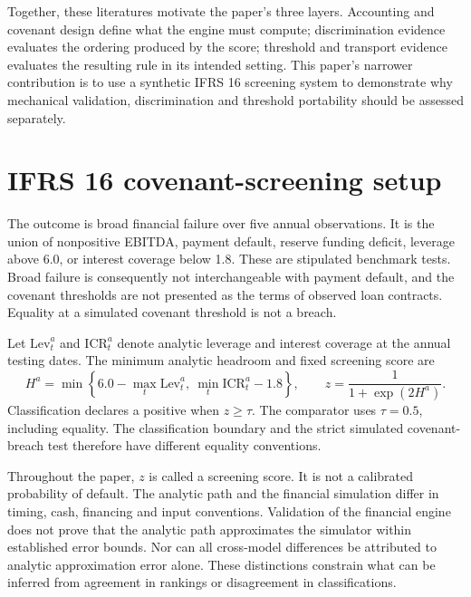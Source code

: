 \documentclass[11pt,a4paper]{article}
\begin{document}
Together, these literatures motivate the paper's three layers. Accounting and covenant design define what the engine must compute; discrimination evidence evaluates the ordering produced by the score; threshold and transport evidence evaluates the resulting rule in its intended setting. This paper's narrower contribution is to use a synthetic IFRS 16 screening system to demonstrate why mechanical validation, discrimination and threshold portability should be assessed separately.

\section{IFRS 16 covenant-screening setup}
The outcome is broad financial failure over five annual observations. It is the union of nonpositive EBITDA, payment default, reserve funding deficit, leverage above 6.0, or interest coverage below 1.8. These are stipulated benchmark tests. Broad failure is consequently not interchangeable with payment default, and the covenant thresholds are not presented as the terms of observed loan contracts. Equality at a simulated covenant threshold is not a breach.

Let $\mathrm{Lev}^{a}_{t}$ and $\mathrm{ICR}^{a}_{t}$ denote analytic leverage and interest coverage at the annual testing dates. The minimum analytic headroom and fixed screening score are
\begin{equation}
H^a=\min\left\{6.0-\max_t\mathrm{Lev}^{a}_{t},\ \min_t\mathrm{ICR}^{a}_{t}-1.8\right\},
\qquad z=\frac{1}{1+\exp(2H^a)}.
\label{eq:score}
\end{equation}
Classification declares a positive when $z\geq\tau$. The comparator uses $\tau=0.5$, including equality. The classification boundary and the strict simulated covenant-breach test therefore have different equality conventions.

Throughout the paper, $z$ is called a screening score. It is not a calibrated probability of default. The analytic path and the financial simulation differ in timing, cash, financing and input conventions. Validation of the financial engine does not prove that the analytic path approximates the simulator within established error bounds. Nor can all cross-model differences be attributed to analytic approximation error alone. These distinctions constrain what can be inferred from agreement in rankings or disagreement in classifications.
\end{document}
